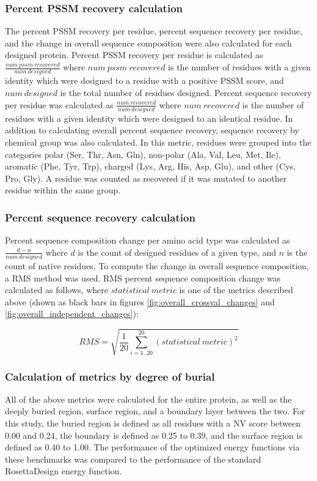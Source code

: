 \subsubsection{Percent \acs{PSSM} recovery calculation}
The percent \ac{PSSM} recovery per residue, percent sequence recovery per residue, and the change in overall sequence composition were also calculated for each designed protein.
Percent \ac{PSSM} recovery per residue is calculated as $\frac{num\ pssm\ recovered}{num\ designed}$ where $num\ pssm\ recovered$ is the number of residues with a given identity which were designed to a residue with a positive \ac{PSSM} score, and $num\ designed$ is the total number of residues designed. 
Percent sequence recovery per residue was calculated as $\frac{num\ recovered}{num\ designed}$ where $num\ recovered$ is the number of residues with a given identity which were designed to an identical residue.
In addition to calculating overall percent sequence recovery, sequence recovery by chemical group was also calculated.
In this metric, residues were grouped into the categories polar (Ser, Thr, Asn, Gln), non-polar (Ala, Val, Leu, Met, Ile), aromatic (Phe, Tyr, Trp), charged (Lys, Arg, His, Asp, Glu), and other (Cys, Pro, Gly). 
A residue was counted as recovered if it was mutated to another residue within the same group.

\subsubsection{Percent sequence recovery calculation}
Percent sequence composition change per amino acid type was calculated as $\frac{d-n}{num\ designed}$ where $d$ is the count of designed residues of a given type, and $n$ is the count of native residues.
To compute the change in overall sequence composition, a \ac{RMS} method was used.
\ac{RMS} percent sequence composition change was calculated as follows, where $statistical\ metric$ is one of the metrics described above (shown as black bars in figures \ref{fig:overall_crossval_changes} and \ref{fig:overall_independent_changes}):

\begin{equation}
RMS=\sqrt{\frac{1}{20}\sum^{20}_{i=1..20}(statistical\ metric)^{2}}
\end{equation}

\subsubsection{Calculation of metrics by degree of burial}
All of the above metrics were calculated for the entire protein, as well as the deeply buried region, surface region, and a boundary layer between the two.
For this study, the buried region is defined as all residues with a \ac{NV} score between 0.00 and 0.24, the boundary is defined as 0.25 to 0.39, and the surface region is defined as 0.40 to 1.00.
The performance of the optimized energy functions via these benchmarks was compared to the performance of the standard RosettaDesign energy function.

